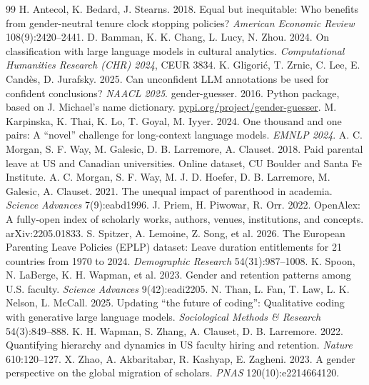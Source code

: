 \documentclass[10pt,twocolumn]{article}
\begin{document}
\small
\begin{thebibliography}{99}
 H. Antecol, K. Bedard, J. Stearns. 2018. Equal but inequitable: Who benefits from gender-neutral tenure clock stopping policies? \emph{American Economic Review} 108(9):2420--2441.
 D. Bamman, K. K. Chang, L. Lucy, N. Zhou. 2024. On classification with large language models in cultural analytics. \emph{Computational Humanities Research (CHR) 2024}, CEUR 3834.
 K. Gligori\'c, T. Zrnic, C. Lee, E. Cand\`es, D. Jurafsky. 2025. Can unconfident LLM annotations be used for confident conclusions? \emph{NAACL 2025}.
 gender-guesser. 2016. Python package, based on J. Michael's name dictionary. \url{pypi.org/project/gender-guesser}.
 M. Karpinska, K. Thai, K. Lo, T. Goyal, M. Iyyer. 2024. One thousand and one pairs: A ``novel'' challenge for long-context language models. \emph{EMNLP 2024}.
 A. C. Morgan, S. F. Way, M. Galesic, D. B. Larremore, A. Clauset. 2018. Paid parental leave at US and Canadian universities. Online dataset, CU Boulder and Santa Fe Institute.
 A. C. Morgan, S. F. Way, M. J. D. Hoefer, D. B. Larremore, M. Galesic, A. Clauset. 2021. The unequal impact of parenthood in academia. \emph{Science Advances} 7(9):eabd1996.
 J. Priem, H. Piwowar, R. Orr. 2022. OpenAlex: A fully-open index of scholarly works, authors, venues, institutions, and concepts. arXiv:2205.01833.
 S. Spitzer, A. Lemoine, Z. Song, et al. 2026. The European Parenting Leave Policies (EPLP) dataset: Leave duration entitlements for 21 countries from 1970 to 2024. \emph{Demographic Research} 54(31):987--1008.
 K. Spoon, N. LaBerge, K. H. Wapman, et al. 2023. Gender and retention patterns among U.S. faculty. \emph{Science Advances} 9(42):eadi2205.
 N. Than, L. Fan, T. Law, L. K. Nelson, L. McCall. 2025. Updating ``the future of coding'': Qualitative coding with generative large language models. \emph{Sociological Methods \& Research} 54(3):849--888.
 K. H. Wapman, S. Zhang, A. Clauset, D. B. Larremore. 2022. Quantifying hierarchy and dynamics in US faculty hiring and retention. \emph{Nature} 610:120--127.
 X. Zhao, A. Akbaritabar, R. Kashyap, E. Zagheni. 2023. A gender perspective on the global migration of scholars. \emph{PNAS} 120(10):e2214664120.
\end{thebibliography}
\end{document}
